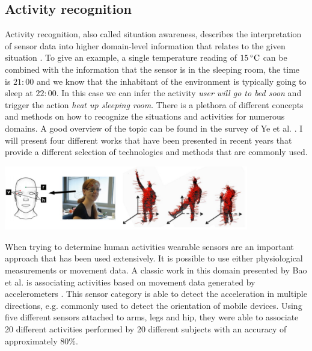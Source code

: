 \subsection{Activity recognition}
Activity recognition, also called situation awareness, describes the interpretation of sensor data into higher domain-level information that relates to the given situation \cite{ye2012situation}. To give an example, a single temperature reading of $15\,^{\circ}{\rm C}$ can be combined with the information that the sensor is in the sleeping room, the time is $21:00$ and we know that the inhabitant of the environment is typically going to sleep at $22:00$. In this case we can infer the activity \emph{user will go to bed soon} and trigger the action \emph{heat up sleeping room}. There is a plethora of different concepts and methods on how to recognize the situations and activities for numerous domains. A good overview of the topic can be found in the survey of Ye et al. \cite{ye2012situation}. I will present four different works that have been presented in recent years that provide a different selection of technologies and methods that are commonly used.

\begin{minipage}{\linewidth}
\centering
\includegraphics[width=0.8\textwidth]{images/rel_app_activity}
\label{fig:rel_app_activity}
\end{minipage}	

When trying to determine human activities wearable sensors are an important approach that has been used extensively. It is possible to use either physiological measurements or movement data. A classic work in this domain presented by Bao et al. is associating activities based on movement data generated by accelerometers \cite{Bao2004}. This sensor category is able to detect the acceleration in multiple directions, e.g. commonly used to detect the orientation of mobile devices. Using five different sensors attached to arms, legs and hip, they were able to associate 20 different activities performed by 20 different subjects with an accuracy of approximately $80\%$.

